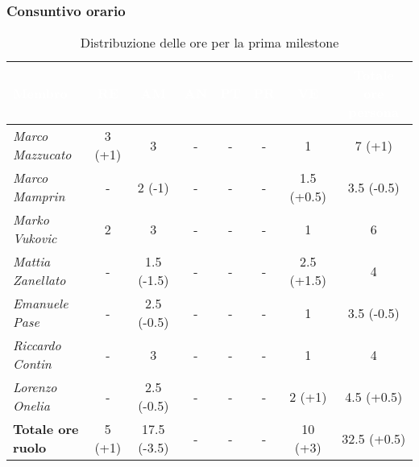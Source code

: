 \subsubsection{Consuntivo orario}
\begin{table}[H]
    \renewcommand\arraystretch{1.5}
    \centering
    \begin{adjustwidth}{-1.15cm}{}
    \begin{tabular}{|l|c|c|c|c|c|c|c|}
    \hline
    \rowcolor[HTML]{036400} 
    \textcolor{white}{\textbf{Membro}} & \multicolumn{1}{c|}{\textcolor{white}{\textbf{RE}}} & \multicolumn{1}{c|}{\textcolor{white}{\textbf{AM}}} & \multicolumn{1}{c|}{\textcolor{white}{\textbf{AN}}} & \multicolumn{1}{c|}{\textcolor{white}{\textbf{PT}}} & \multicolumn{1}{c|}{\textcolor{white}{\textbf{PR}}} & \multicolumn{1}{c|}{\textcolor{white}{\textbf{VE}}} & \multicolumn{1}{c|}{\textcolor{white}{\textbf{Totale ore persona}}} \\ \hline
    \rowcolor[HTML]{EFEFEF}\textit{Marco Mazzucato}  & 3 (+1) & 3          & - & - & - & 1         & 7 (+1)   \\ \hline
    \rowcolor[HTML]{C0C0C0}\textit{Marco Mamprin}    & -      & 2 (-1)     & - & - & - & 1.5 (+0.5)& 3.5 (-0.5) \\ \hline
    \rowcolor[HTML]{EFEFEF}\textit{Marko Vukovic}    & 2      & 3          & - & - & - & 1         & 6        \\ \hline
    \rowcolor[HTML]{C0C0C0}\textit{Mattia Zanellato} & -      & 1.5 (-1.5) & - & - & - & 2.5 (+1.5)& 4        \\ \hline
    \rowcolor[HTML]{EFEFEF}\textit{Emanuele Pase}    & -      & 2.5 (-0.5) & - & - & - & 1         & 3.5 (-0.5) \\ \hline
    \rowcolor[HTML]{C0C0C0}\textit{Riccardo Contin}  & -      & 3          & - & - & - & 1         & 4        \\ \hline
    \rowcolor[HTML]{EFEFEF}\textit{Lorenzo Onelia}   & -      & 2.5 (-0.5) & - & - & - & 2 (+1)    & 4.5 (+0.5) \\ \hline
    \rowcolor[HTML]{C0C0C0}\textbf{Totale ore ruolo} & 5 (+1) & 17.5 (-3.5)& - & - & - & 10 (+3)   & 32.5 (+0.5)\\ \hline
    \end{tabular}
    \end{adjustwidth}
    \caption{Distribuzione delle ore per la prima milestone}
\end{table}


